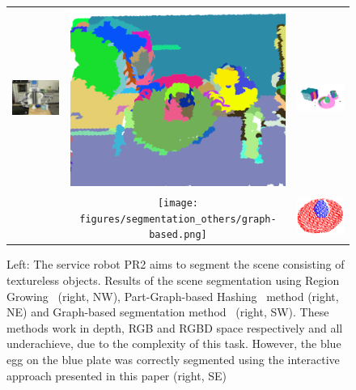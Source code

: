 \setlength{\tabcolsep}{0.1em}
\begin{figure}[ht]
\begin{tabular}{cccc}
\multicolumn{2}{c}{\multirow{-6}{*}{\includegraphics[width=0.5\columnwidth]{figures/teaser/IMG_0395.JPG}
}} & \includegraphics[width=0.23\columnwidth]{figures/segmentation_others/region_growing_rgb.png} 
&\includegraphics[width=0.23\columnwidth]{figures/segmentation_others/part-graph-hashing.png} \\
\multicolumn{2}{c}{} & \texttt{[image: figures/segmentation\_others/graph-based.png]} &\includegraphics[width=0.23\columnwidth]{pictures/teaser_egg_result-cropped.png} 
\end{tabular}
\caption{Left: The service robot PR2 aims to segment the scene
  consisting of textureless objects. Results  of  the   scene segmentation
  using Region  Growing~\cite{RGBRegionGrowing} (right, NW), Part-Graph-based 
  Hashing~\cite{marton12SC} method (right, NE) and Graph-based  
  segmentation method~\cite{Felzenszwalb}   (right, SW). These methods work in depth, RGB and RGBD 
  space respectively and all underachieve, due to the complexity of this task. 
  However, the blue egg on the blue plate was correctly segmented using the interactive approach presented in this paper (right, SE)}
\label{fig:tracking_dists}
\end{figure}	
	
